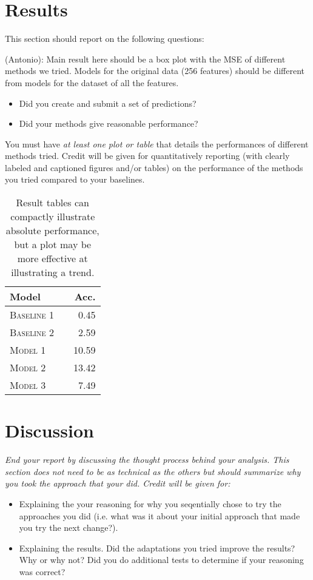 \documentclass[11pt]{article}
\begin{document}
\section{Results}
This section should report on the following questions: 

(Antonio): Main result here should be a box plot with the MSE of different methods we tried. Models for the original data (256 features) should be different from models for the dataset of all the features.

{\itshape
\begin{itemize}
\item Did you create and submit a set of
  predictions? 
  

\item  Did your methods give reasonable performance?  
\end{itemize}

\noindent You must have \textit{at least one plot or table}
that details the performances of different methods tried. 
Credit will be given for quantitatively reporting (with clearly
labeled and captioned figures and/or tables) on the performance of the
methods you tried compared to your baselines.



\begin{table}
\centering
\begin{tabular}{llr}
 \toprule
 Model &  & Acc. \\
 \midrule
 \textsc{Baseline 1} & & 0.45\\
 \textsc{Baseline 2} & & 2.59 \\
 \textsc{Model 1} & & 10.59  \\
 \textsc{Model 2} & &13.42 \\
 \textsc{Model 3} & & 7.49\\
 \bottomrule
\end{tabular}
\caption{\label{tab:results} Result tables can compactly illustrate absolute performance, but a plot may be more effective at illustrating a trend.}
\end{table}
}



\section{Discussion} 

{\itshape
End your report by discussing the thought process behind your
analysis. This section does not need to be as technical as the others 
but should summarize why you took the approach that your did. Credit will be given for:

  \begin{itemize}
  \item Explaining the your reasoning for why you seqentially chose to
    try the approaches you did (i.e. what was it about your initial
    approach that made you try the next change?).  
  \item Explaining the results.  Did the adaptations you tried improve
    the results?  Why or why not?  Did you do additional tests to
    determine if your reasoning was correct?  
  \end{itemize}
 }
\end{document}
